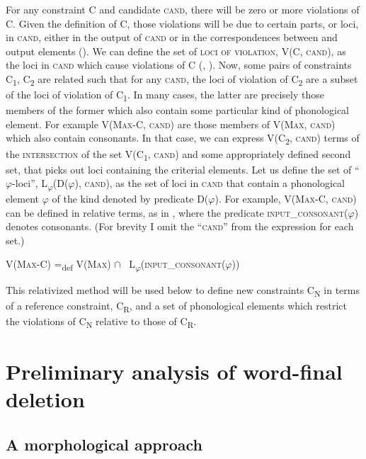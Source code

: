 \documentclass[output=paper,
modfonts
]{LSP/langsci}
\begin{document}
For any constraint C and candidate \textsc{cand,} there will be zero or more violations of C. Given the definition of C, those violations will be due to certain parts, or loci, in \textsc{cand}, either in the output of \textsc{cand} or in the correspondences between  and output elements (\citealt{mccarthy1995r}). We can define the set of \textsc{loci of violation,} V(C, \textsc{cand}), as the loci in \textsc{cand} which cause violations of C (\citealt{mccarthy2003}, \citealt{lubowicz2005}). Now, some pairs of constraints C\textsubscript{1}, C\textsubscript{2} are related such that for any \textsc{cand}, the loci of violation of C\textsubscript{2} are a subset of the loci of violation of C\textsubscript{1}. In many cases, the latter are precisely those members of the former which also contain some particular kind of phonological element. For example V(\textsc{Max}{}-C, \textsc{cand}) are those members of V(\textsc{Max}, \textsc{cand}) which also contain  consonants. In that case, we can express V(C\textsubscript{2}, \textsc{cand}) terms of the \textsc{intersection} of the set V(C\textsubscript{1}, \textsc{cand}) and some appropriately defined second set, that picks out loci containing the criterial elements. Let us define the set of ``$\varphi $-loci'', L\textsubscript{$\varphi $}(D($\varphi $), \textsc{cand}), as the set of loci in \textsc{cand} that contain a phonological element $\varphi $ of the kind denoted by predicate D($\varphi $). For example, V(\textsc{Max}{}-C, \textsc{cand}) can be defined in relative terms, as in , where the predicate \textsc{input\_consonant}($\varphi $) denotes  consonants. (For brevity I omit the ``\textsc{cand}'' from the expression for each set.)

\ea \label{ex:round:16} 
V(\textsc{Max-C})  =\textsubscript{def} V(\textsc{Max}) ${\cap}$ \ L\textsubscript{$\varphi $}(\textsc{input\_consonant}($\varphi $))
\z

This relativized method will be used below to define new constraints C\textsubscript{N} in terms of a reference constraint, C\textsubscript{R}, and a set of phonological elements which restrict the violations of C\textsubscript{N} relative to those of C\textsubscript{R}.

\section[Preliminary analysis of word{}-final \isi{deletion}]{Preliminary analysis of word-final deletion}\label{sec:round:4}
\label{bkm:Ref335660381}\subsection[A morphological approach]{A morphological approach}
\end{document}

